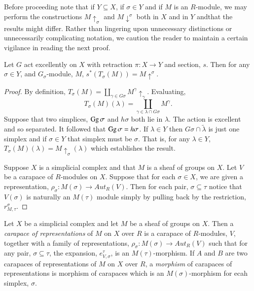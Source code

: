 Before proceeding note that if $Y \subseteq X$, if $\sigma \in Y$ and if $M$ is an $R$-module, we may perform the constructions $M \uparrow_{\sigma}$ and $M \downarrow^{\sigma}$ both in $X$ and in $Y$ and\pageoriginale that the results might differ. Rather than lingering upon unnecessary distinctions or unnecessarily complicating notation, we caution the reader to maintain a certain vigilance in reading the next proof.

\begin{seclem}\label{chap6-lemma-9.9}
Let $G$ act excellently on $X$ with retraction $\pi : X\rightarrow Y$ and section, $s$. Then for any $\sigma \in Y$, and $G_{\sigma}$-module, $M$, $s^{*}(T_{\sigma}(M)) = M \uparrow^{\sigma}$.
\end{seclem}

\begin{proof}
By definition, $T_{\sigma}(M) = \coprod_{\gamma \in G\sigma}M^{\gamma} \uparrow_{\gamma}$. Evaluating,
$$
T_{\sigma}(M)(\lambda) = \coprod_{\gamma \in \lambda \cap G{\sigma}} M^{\gamma}.
$$
Suppose that two simplices, $\operatorname{Gg} \sigma$ and $h\sigma$ both  lie in $\lambda$. The action is excellent and so separated. It followed that $\operatorname{Gg} \sigma = h \sigma$. If $\lambda \in Y$ then $G\sigma \cap \tilde{\lambda}$ is just one simplex and if $\sigma \in Y$ that simplex must be $\sigma$. That is, for any $\lambda \in Y$, $T_{\sigma}(M)(\lambda) = M\uparrow_{\sigma}(\lambda)$ which establishes the result.

Suppose $X$ is a simplicial complex and that $M$ is a sheaf of groups on $X$. Let $V$ be a carapace of $R$-modules on $X$. Suppose that for each $\sigma \in X$, we are given a representation, $\rho_{\sigma}:M(\sigma) \rightarrow Aut_{R}(V)$. Then for each pair,  $\sigma \subseteq \tau$ notice that $V(\sigma)$ is naturally an $M(\tau)$ module simply by pulling back by the restriction, $r_{M, \tau}^{\sigma}$.
\end{proof}

\begin{definition}\label{chap6-definition-9.10}
Let $X$ be a simplicial complex and let $M$ be a sheaf of groups on $X$. Then a \textit{carapace of representations} of $M$ on $X$ over $R$ is a carapace of $R$-modules, $V$, together with a family of representations, $\rho_{\sigma}: M(\sigma) \rightarrow Aut_{R}(V)$ such that for any pair, $\sigma \subseteq \tau$, the expansion, $e_{V, \sigma}^{\tau}$, is an $M(\tau)$-morphism. If $A$ and $B$ are two carapaces of representations of $M$ on $X$ over $R$, a \textit{morphism} of carapaces of representations is morphism of carapaces which is an $M(\sigma)$-morphism for ecah simplex, $\sigma$.
\end{definition}

